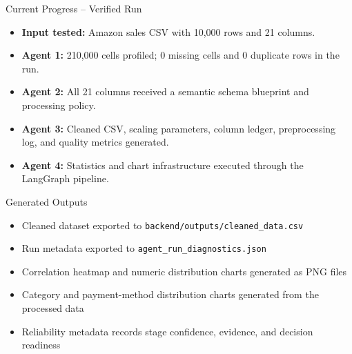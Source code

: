 
\begin{frame}{Current Progress -- Verified Run}
    \begin{itemize}
        \item \textbf{Input tested:} Amazon sales CSV with 10,000 rows and 21 columns.
        \item \textbf{Agent 1:} 210,000 cells profiled; 0 missing cells and 0 duplicate rows in the run.
        \item \textbf{Agent 2:} All 21 columns received a semantic schema blueprint and processing policy.
        \item \textbf{Agent 3:} Cleaned CSV, scaling parameters, column ledger, preprocessing log, and quality metrics generated.
        \item \textbf{Agent 4:} Statistics and chart infrastructure executed through the LangGraph pipeline.
    \end{itemize}
\end{frame}

\begin{frame}{Generated Outputs}
    \begin{itemize}
        \item Cleaned dataset exported to \texttt{backend/outputs/cleaned\_data.csv}
        \item Run metadata exported to \texttt{agent\_run\_diagnostics.json}
        \item Correlation heatmap and numeric distribution charts generated as PNG files
        \item Category and payment-method distribution charts generated from the processed data
        \item Reliability metadata records stage confidence, evidence, and decision readiness
    \end{itemize}
\end{frame}

